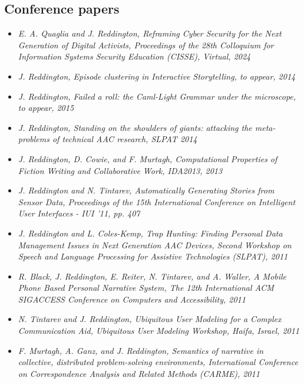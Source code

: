 \subsection*{Conference papers}
\begin{itemize}
\item{\em E. A. Quaglia and J. Reddington, Reframing Cyber Security for the Next Generation of Digital Activists, Proceedings of the 28th Colloquium for Information Systems Security Education (CISSE), Virtual, 2024}

\item{\em J. Reddington, Episode clustering in Interactive Storytelling, to appear, 2014}

\item{\em J. Reddington, Failed a roll: the Caml-Light Grammar under the microscope, to appear, 2015}

\item{\em J. Reddington, Standing on the shoulders of giants: attacking the meta-problems of technical AAC research, SLPAT 2014}

\item{\em J. Reddington, D. Cowie, and F. Murtagh, Computational Properties of Fiction Writing and Collaborative Work, IDA2013, 2013}

\item{\em J. Reddington and N. Tintarev, Automatically Generating Stories from Sensor Data, Proceedings of the 15th International Conference on Intelligent User Interfaces - IUI '11, pp. 407}

\item{\em J. Reddington and L. Coles-Kemp, Trap Hunting: Finding Personal Data Management Issues in Next Generation AAC Devices, Second Workshop on Speech and Language Processing for Assistive Technologies (SLPAT), 2011}

\item{\em R. Black, J. Reddington, E. Reiter, N. Tintarev, and A. Waller, A Mobile Phone Based Personal Narrative System, The 12th International ACM SIGACCESS Conference on Computers and Accessibility, 2011}

\item{\em N. Tintarev and J. Reddington, Ubiquitous User Modeling for a Complex Communication Aid, Ubiquitous User Modeling Workshop, Haifa, Israel, 2011}

\item{\em F. Murtagh, A. Ganz, and J. Reddington, Semantics of narrative in collective, distributed problem-solving environments, International Conference on Correspondence Analysis and Related Methods (CARME), 2011}


\end{itemize}
